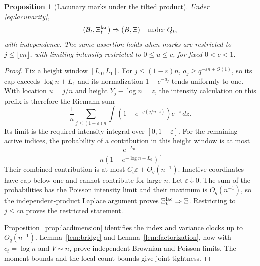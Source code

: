 \documentclass[11pt,a4paper]{article}
\numberwithin{equation}{section}
\newtheorem{proposition}[theorem]{Proposition}
\theoremstyle{definition}
\theoremstyle{remark}
\newcommand{\eps}{\varepsilon}
\begin{document}
\begin{proposition}[Lacunary marks under the tilted product]
\label{prop:lacpp}
Under \eqref{eq:lacunarity},
\begin{equation}
 (\mathcal B_t,\Xi_t^{\rm lac})\Rightarrow(B,\Xi)
 \quad\text{under }Q_t, \label{eq:tiltedlacjoint}
\end{equation}
with independence. The same assertion holds when marks are restricted
to $j\le\lfloor cn\rfloor$, with limiting intensity restricted to
$0\le u\le c$, for fixed $0<c<1$.
\end{proposition}
\begin{proof}
Fix a height window $[L_0,L_1]$. For $j\le(1-\eps)n$,
$a_j\ge q^{-\eps n+O(1)}$, so its cap exceeds $\log n+L_1$
and its normalization $1-e^{-a_j}$ tends uniformly to one.
With location $u=j/n$ and height $Y_j-\log n=z$, the intensity
calculation on this prefix is therefore the Riemann sum
\[
 \frac1n\sum_{j\le(1-\eps)n}
    \int(1-e^{-g(j/n,z)})e^{-z}\,dz.
\]
Its limit is the required intensity integral over $[0,1-\eps]$.
For the remaining active indices, the probability of a contribution
in this height window is at most
\[
 \frac{e^{-L_0}}{n(1-e^{-\log n-L_0})}.
\]
Their combined contribution is at most $C_g\eps+O_g(n^{-1})$.
Inactive coordinates have cap below one and cannot contribute for
large $n$. Let $\eps\downarrow0$. The sum of the probabilities
has the Poisson intensity limit and their maximum is $O_g(n^{-1})$,
so the independent-product Laplace argument proves
$\Xi_t^{\rm lac}\Rightarrow\Xi$. Restricting to $j\le cn$ proves
the restricted statement.

Proposition~\ref{prop:lacdimension} identifies the index and variance
clocks up to $O_q(n^{-1})$. Lemma~\ref{lem:bridge} and
Lemma~\ref{lem:factorization}, now with $c_t=\log n$ and
$V\sim n$, prove independent Brownian and Poisson limits. The
moment bounds and the local count bounds give joint tightness.
\end{proof}
\end{document}
